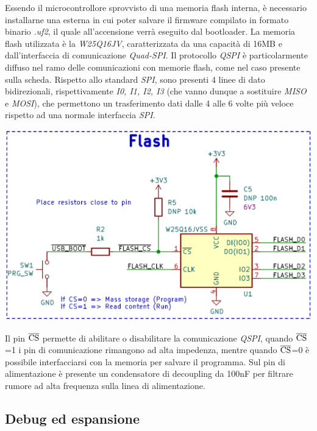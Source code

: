 Essendo il microcontrollore sprovvisto di una memoria flash interna, 
è necessario installarne una esterna in cui poter salvare il firmware compilato in formato
binario \emph{.uf2}, il quale all'accensione verrà eseguito dal bootloader. La
memoria flash utilizzata è la \emph{W25Q16JV}, caratterizzata da una capacità di 16MB e dall’interfaccia di comunicazione \emph{Quad-SPI}.
Il protocollo \emph{QSPI} è particolarmente diffuso nel ramo delle comunicazioni con memorie flash,
come nel caso presente sulla scheda. Rispetto allo standard \emph{SPI}, sono
presenti 4 linee di dato bidirezionali, rispettivamente \emph{I0, I1,
I2, I3} (che vanno dunque a sostituire \emph{MISO} e \emph{MOSI}), che
permettono un trasferimento dati dalle 4 alle 6 volte più veloce
rispetto ad una normale interfaccia \emph{SPI}.

\begin{center}
\includegraphics[scale=0.2]{figures/image49.png}
\captionsetup{type=figure}
\end{center}

\noindent Il pin $\overline{\rm {CS}}$ permette di abilitare o
disabilitare la comunicazione \emph{QSPI}, quando $\overline{\rm {CS}}$=1 i pin di
comunicazione rimangono ad alta impedenza, mentre quando $\overline{\rm {CS}}$=0 è
possibile interfacciarsi con la memoria per salvare il programma.
Sul pin di alimentazione è presente un condensatore di decoupling da 100nF per filtrare rumore ad alta
frequenza sulla linea di alimentazione.

\hypertarget{debug-ed-espansione}{%
\subsection{\texorpdfstring{Debug ed espansione}{ Debug ed espansione}}\label{debug-ed-espansione}}

